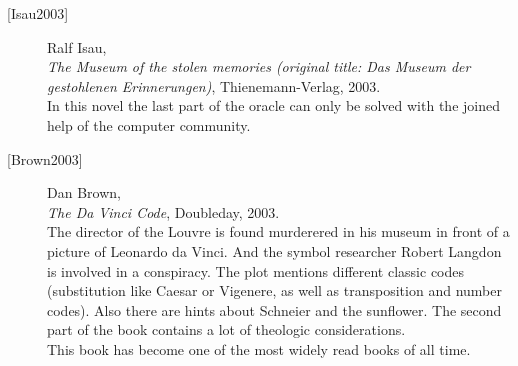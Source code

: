 \begin{description}
\item[\textrm{[Isau2003]}] 
    Ralf Isau, \\
    {\em The Museum of the stolen memories (original title: Das Museum
    der gestohlenen Erinnerungen)}, Thienemann-Verlag, 2003. \\
    In this novel the last part of the oracle can only be
    solved with the joined help of the computer community.


\item[\textrm{[Brown2003]}] 
    Dan Brown, \\
    {\em The Da Vinci Code}, Doubleday, 2003. \\
    The director of the Louvre is found murderered in his museum in
    front of a picture of Leonardo da Vinci. And the symbol researcher
    Robert Langdon is involved in a conspiracy.
    The plot mentions different classic codes (substitution like
    Caesar or Vigenere, as well as transposition and number codes).
    Also there are hints about Schneier and the sunflower.
    The second part of the book contains a lot of theologic considerations.\\
    This book has become one of the most widely read books of all time.


\end{description}




